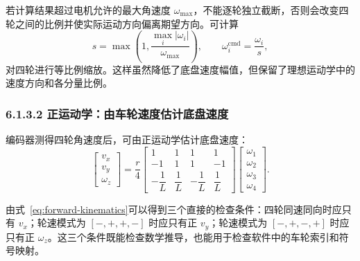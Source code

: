 \documentclass[UTF8,zihao=-4]{ctexart}
\begin{document}
若计算结果超过电机允许的最大角速度 $\omega_{\max}$，不能逐轮独立截断，否则会改变四轮之间的比例并使实际运动方向偏离期望方向。可计算
\begin{equation}
  s=\max\left(1,\frac{\max_i|\omega_i|}{\omega_{\max}}\right),
  \qquad
  \omega_i^{\mathrm{cmd}}=\frac{\omega_i}{s},
  \label{eq:wheel-normalization}
\end{equation}
对四轮进行等比例缩放。这样虽然降低了底盘速度幅值，但保留了理想运动学中的速度方向和各分量比例。

\subsubsection*{6.1.3.2 正运动学：由车轮速度估计底盘速度}

编码器测得四轮角速度后，可由正运动学估计底盘速度：
\begin{equation}
  \begin{bmatrix}
    v_x\\
    v_y\\
    \omega_z
  \end{bmatrix}
  =
  \frac{r}{4}
  \begin{bmatrix}
    1 & 1 & 1 & 1\\
   -1 & 1 & 1 &-1\\
   -\dfrac{1}{L} & \dfrac{1}{L} & -\dfrac{1}{L} & \dfrac{1}{L}
  \end{bmatrix}
  \begin{bmatrix}
    \omega_1\\
    \omega_2\\
    \omega_3\\
    \omega_4
  \end{bmatrix}.
  \label{eq:forward-kinematics}
\end{equation}

由式~\eqref{eq:forward-kinematics}可以得到三个直接的检查条件：四轮同速同向时应只有 $v_x$；轮速模式为 $[-,+,+,-]$ 时应只有正 $v_y$；轮速模式为 $[-,+,-,+]$ 时应只有正 $\omega_z$。这三个条件既能检查数学推导，也能用于检查软件中的车轮索引和符号映射。
\end{document}

